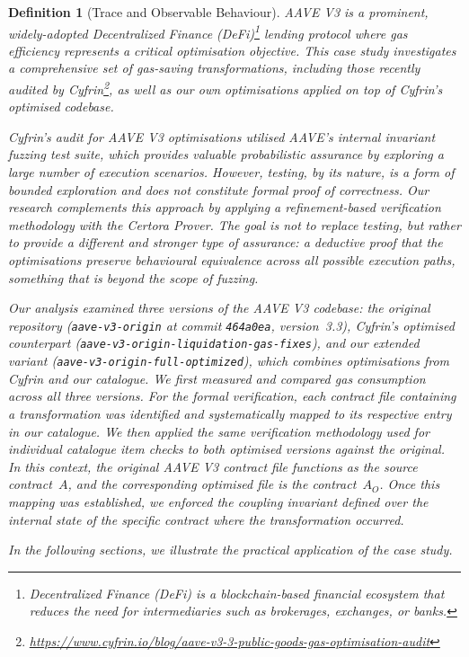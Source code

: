 \documentclass[manuscript,screen,review]{acmart}
\newtheorem{definition}{Definition}
\begin{document}
\begin{definition}[Trace and Observable Behaviour]
AAVE V3 is a prominent, widely-adopted Decentralized Finance (DeFi)\footnote{Decentralized Finance (DeFi) is a blockchain-based financial ecosystem that reduces the need for intermediaries such as brokerages, exchanges, or banks.} lending protocol where gas efficiency represents a critical optimisation objective. This case study investigates a comprehensive set of gas-saving transformations, including those recently audited by Cyfrin\footnote{\url{https://www.cyfrin.io/blog/aave-v3-3-public-goods-gas-optimisation-audit}},
as well as our own optimisations applied on top of Cyfrin's optimised codebase.

Cyfrin's audit for AAVE V3 optimisations utilised AAVE's internal invariant fuzzing test suite, which provides valuable probabilistic assurance by exploring a large number of execution scenarios. However, testing, by its nature, is a form of bounded exploration and does not constitute formal proof of correctness. Our research complements this approach by applying a refinement-based verification methodology with the Certora Prover. The goal is not to replace testing, but rather to provide a different and stronger type of assurance: a deductive proof that the optimisations preserve behavioural equivalence across all possible execution paths, something that is beyond the scope of fuzzing.

Our analysis examined three versions of the AAVE V3 codebase: the original repository (\texttt{aave-v3-origin} at commit \texttt{464a0ea}, version~3.3), Cyfrin's optimised counterpart (\texttt{aave-v3-origin-liquidation-gas-fixes}), and our extended variant (\texttt{aave-v3-origin-full-optimized}), which combines optimisations from Cyfrin and our catalogue. We first measured and compared gas consumption across all three versions. For the formal verification, each contract file containing a transformation was identified and systematically mapped to its respective entry in our catalogue. We then applied the same verification methodology used for individual catalogue item checks to both optimised versions against the original. In this context, the original AAVE V3 contract file functions as the source contract~$A$, and the corresponding optimised file is the contract~$A_{O}$. Once this mapping was established, we enforced the coupling invariant defined over the internal state of the specific contract where the transformation occurred.

In the following sections, we illustrate the practical application of the case study.


\end{definition}
\end{document}
